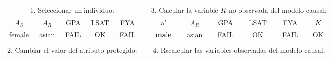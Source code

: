 \documentclass[oneside,openright,titlepage,numbers=noenddot,openany,headinclude,footinclude=true,
cleardoublepage=empty,abstractoff,BCOR=5mm,paper=a4,fontsize=12pt,main=spanish]{scrreprt}
\begin{document}
\begin{table}[h]
\centering
\resizebox{16.1cm}{!} {
\begin{tabular}{ccccclcccccc}
\cline{1-5} \cline{7-12}
\multicolumn{5}{|c|}{1. Seleccionar un individuo:}                                                                                                                                                                       & \multicolumn{1}{l|}{}          & \multicolumn{6}{c|}{3. Calcular la variable $K$ no observada del modelo causal:}                                                                                                                                                                                                      \\ \cline{1-5} \cline{7-12} 
\multicolumn{1}{|c|}{$A_S$} & \multicolumn{1}{c|}{$A_R$}          & \multicolumn{1}{c|}{GPA}                         & \multicolumn{1}{c|}{LSAT}                      & \multicolumn{1}{c|}{FYA}                         & \multicolumn{1}{l|}{\textbf{}} & \multicolumn{1}{c|}{a'} & \multicolumn{1}{c|}{$A_R$}             & \multicolumn{1}{c|}{GPA}                         & \multicolumn{1}{c|}{LSAT}                      & \multicolumn{1}{c|}{FYA}                         & \multicolumn{1}{c|}{$K$}                       \\ \cline{1-5} \cline{7-12} 
\multicolumn{1}{|c|}{female}  & \multicolumn{1}{c|}{asian}          & \multicolumn{1}{c|}{{\color[HTML]{FE0000} FAIL}} & \multicolumn{1}{c|}{{\color[HTML]{32CB00} OK}} & \multicolumn{1}{c|}{{\color[HTML]{FE0000} FAIL}} & \multicolumn{1}{l|}{}          & \multicolumn{1}{c|}{\textbf{male}}  & \multicolumn{1}{c|}{asian} & \multicolumn{1}{c|}{{\color[HTML]{FE0000} FAIL}} & \multicolumn{1}{c|}{{\color[HTML]{32CB00} OK}} & \multicolumn{1}{c|}{{\color[HTML]{FE0000} FAIL}} & \multicolumn{1}{c|}{{\color[HTML]{32CB00} OK}} \\ \cline{1-5} \cline{7-12} 
\multicolumn{1}{l}{}        & \multicolumn{1}{l}{}                & \multicolumn{1}{l}{}                             & \multicolumn{1}{l}{}                           & \multicolumn{1}{l}{}                             &                                & \multicolumn{1}{l}{}       & \multicolumn{1}{l}{}                & \multicolumn{1}{l}{}                             & \multicolumn{1}{l}{}                           & \multicolumn{1}{l}{}                             & \multicolumn{1}{l}{}                           \\ \cline{1-5} \cline{7-12} 
\multicolumn{5}{|c|}{2. Cambiar el valor del atributo protegido:}                                                                                                                                                        & \multicolumn{1}{l|}{}          & \multicolumn{6}{c|}{4. Recalcular las variables observadas del modelo causal:}                                                                                                                                                                                                      \\ \cline{1-5} \cline{7-12} 

\end{tabular}}
\end{table}
\end{document}
